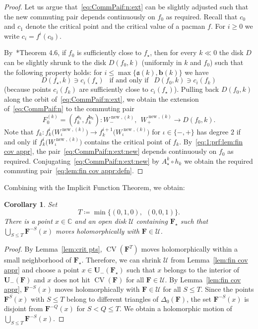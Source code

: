 \documentclass{amsart}
\renewcommand{\sp}{{\ \ }}
\newcommand{\1}{{\mathbb 1 }}
\newcommand{\bDelta}{{\mathbb{\Delta}}}
\newcommand{\bF}{{\mathbf F}}
\newcommand{\bU}{{\mathbf U}}
\newcommand{\str}{{\star}}
\renewcommand{\aa}{\mathfrak{a}}
\newcommand{\bb}{{\mathbf b}}
\newcommand\bUU{{ \boldsymbol{\mathcal U}}}
\newcommand\new{{\operatorname{new}}}
\newcommand{\C}{\mathbb{C}}
\newtheorem{cor}[thm]{Corollary}
\theoremstyle{remark}
\numberwithin{equation}{section}
\theoremstyle{definition}
\newcommand{\CV}{{\operatorname{CV}}}
\theoremstyle{nonumberbreak}
\begin{document}
\begin{proof}
Let us argue that~\eqref{eq:CommPaif:n:ext} can be slightly adjusted such that the new commuting pair depends continuously on $f_0$ as required. Recall that $c_0$ and $c_1$ denote the critical point and the critical value of a pacman $f$. For $i\ge 0 $ we write $c_i=f^i(c_0)$.  



By~\cite{DLS}*{Theorem 4.6}, if $f_0$ is sufficiently close to $f_\str$, then for  every $k\ll0$ the disk $D$ can be slightly shrunk to the disk $D(f_0,k)$ (uniformly in $k$ and $f_0$) such that the following property holds: for $i\le \max\{\aa(k),\bb(k)\}$ we have 
\begin{equation}
\label{eq:1:prf:lem:fin cov appr}
D(f_\str,k)\ni c_i(f_\str)\sp \text{ if and only if }\sp D(f_0,k)\ni c_i(f_k)
\end{equation}
(because points $c_i(f_k)$ are sufficiently close to $c_i(f_\str)$). Pulling back $D(f_0,k)$ along the orbit of~\eqref{eq:CommPaif:n:ext}, we obtain the extension of~\eqref{eq:CommPaif:n} to the commuting pair   
\begin{equation}
\label{eq:CommPaif:n:ext:new}
F^{(k)}_0 =\left( f_{k}^{\aa_k},f^{\bb_k}_{k} \right)\colon  W_{-}^{\new, (k)} ,  \sp W^{\new,(k)}_{+} \to D(f_0,k).
\end{equation}
Note that $f_k\colon f_k^i \big( W_{\iota}^{\new, (k)}  \big)\to  f_k^{i+1} \big( W_{\iota}^{\new, (k)}  \big)$ for $\iota\in\{-,+\}$ has degree $2$ if and only if $ f_k^i \big( W_{\iota}^{\new, (k)}  \big)$ contains the critical point of $f_k$. By~\eqref{eq:1:prf:lem:fin cov appr}, the pair~\eqref{eq:CommPaif:n:ext:new} depends continuously on $f_0$ as required. Conjugating~\eqref{eq:CommPaif:n:ext:new} by $A_\str^k\circ h_k$ we obtain the required commuting pair~\eqref{eq:lem:fin cov appr:defn}.
\end{proof}


Combining with the Implicit Function Theorem, we obtain:
\begin{cor}
\label{cor:hol mot of preimages}
Set \[T\coloneqq \min\{(0,1,0),\sp (0,0,1)\}.\]
There is a point $x\in \C$ and an open disk $\bUU$ containing $\bF_\str$ such that $\displaystyle{ \bigcup_{S\le T}\bF^{-S}(x)}$ moves holomorphically with $\bF\in \bUU$.
\end{cor}
\begin{proof}
By Lemma~\ref{lem:crit pts}, $\CV(\bF^T)$ moves holomorphically within a small neighborhood of $\bF_\str$. Therefore, we can shrink $\bUU$ from Lemma~\ref{lem:fin cov appr} and choose a point $x\in \bU_-(\bF_\str)$ such that $x$ belongs to the interior of $\bU_-(\bF)$ and $x$ does not hit $\CV(\bF)$ for all $\bF\in \bUU$.  By Lemma~\ref{lem:fin cov appr}, $\bF^{-S}(x)$ moves holomorphically with $\bF\in \bUU$ for all $S\le T$. Since the points $\bF^S(x)$ with $S\le T$ belong to different triangles of $\bDelta_0(\bF)$, the set $\bF^{-S}(x)$ is disjoint from $\bF^{-Q}(x)$ for $S<Q\le T$. We obtain a holomorphic motion of $\displaystyle{ \bigcup_{S\le T}\bF^{-S}(x)}$.
\end{proof}
\end{document}
